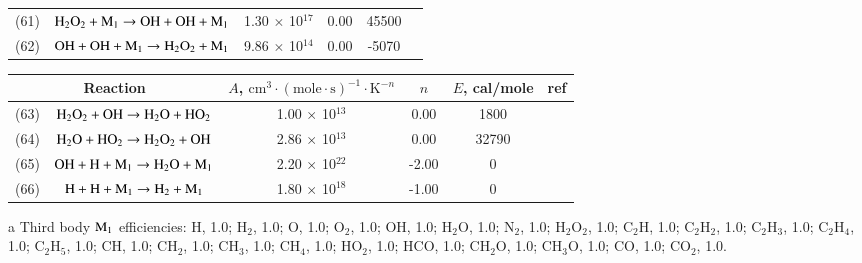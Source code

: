 \documentclass{warpdoc}
\renewcommand{\fontsizetable}{\footnotesize\scalefont{0.9}}
\begin{document}
\begin{table}[h]
\begin{center}
\begin{threeparttable}
\begin{tabular}{cccccc}
(61) & $\rm H_2 O_2 + M_1  \rightarrow OH+OH+M_1 $ &1.30 $\times$ 10$^{17}$  &0.00 &45500&\cite{rkm:1991:smoke}\tnote{a}\\

(62) & $\rm OH+OH+M_1  \rightarrow H_2 O_2 + M_1 $ &9.86 $\times$ 10$^{14}$  &0.00 &-5070&\cite{rkm:1991:smoke}\tnote{a}\\

\bottomrule
\end{tabular}
\label{tab:zet}
\end{threeparttable}
\end{center}
\end{table} 



\begin{table}[h]
\fontsizetable
\begin{center}
\begin{threeparttable}
\renewcommand\thetable{1} 
\begin{tabular}{cccccc} 
\toprule
\multicolumn{2}{c}{Reaction \tnote{d}} & $A$, $\textrm{cm}^3\cdot(\textrm{mole}\cdot \textrm{s})^{-1}\cdot \textrm{K}^{-n}$ & $n$ & $E$, cal/mole & ref \\ 
\midrule

(63) & $\rm H_2 O_2 + OH \rightarrow H_2 O + H O_2 $ &1.00 $\times$ 10$^{13}$  &0.00 &1800&\cite{rkm:1991:smoke}\\

(64) & $\rm H_2 O + H O_2  \rightarrow H_2 O_2 + OH $ &2.86 $\times$ 10$^{13}$  &0.00 &32790&\cite{rkm:1991:smoke}\\

(65) & $\rm OH + H+ M_1  \rightarrow H_2 O +M_1 $ &2.20 $\times$ 10$^{22}$  &-2.00 &0&\cite{rkm:1991:smoke}\tnote{a}\\

(66) & $\rm H + H+ M_1  \rightarrow H_2  +M_1 $ &1.80 $\times$ 10$^{18}$  &-1.00 &0&\cite{rkm:1991:smoke}\tnote{a}\\

\bottomrule
\end{tabular}
\label{tab:zet}
\begin{tablenotes}


\item[{a}] Third body $\rm M_1$ efficiencies: H, 1.0; H$_2$, 1.0; O, 1.0; O$_2$, 1.0; OH, 1.0; H$_2$O, 1.0; N$_2$, 1.0; H$_2$O$_2$, 1.0;
   C$_2$H, 1.0; C$_2$H$_2$, 1.0; C$_2$H$_3$, 1.0; C$_2$H$_4$, 1.0; C$_2$H$_5$, 1.0; CH, 1.0; CH$_2$, 1.0; CH$_3$, 1.0; CH$_4$, 1.0; HO$_2$, 1.0; HCO, 1.0; CH$_2$O, 1.0; CH$_3$O, 1.0; CO, 1.0; CO$_2$, 1.0.


\end{tablenotes}
\end{threeparttable}
\end{center}
\end{table}
\end{document}
